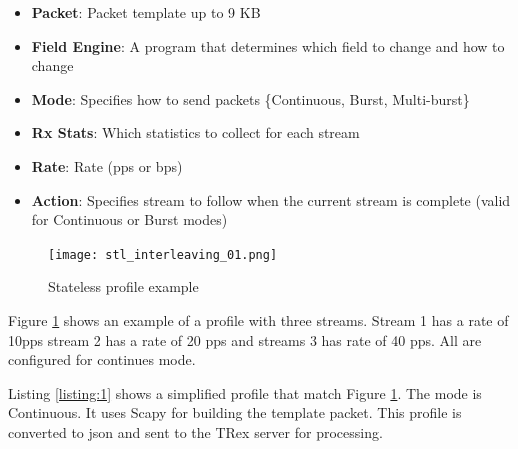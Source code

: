 \documentclass[conference]{IEEEtran}
\begin{document}
\begin{itemize}
  \item \textbf{Packet}: Packet template up to 9 KB
  \item \textbf{Field Engine}: A program that determines which field to change and how to change 
  \item \textbf{Mode}: Specifies how to send packets \{Continuous, Burst, Multi-burst\}
  \item \textbf{Rx Stats}: Which statistics to collect for each stream
  \item \textbf{Rate}: Rate (pps or bps) 
  \item \textbf{Action}: Specifies stream to follow when the current stream is complete (valid for Continuous or Burst modes)
\end{itemize}

\begin{figure}[h]
  \texttt{[image: stl\_interleaving\_01.png]}
  \caption{Stateless profile example}
  \label{fig:stlhello}
\end{figure}

Figure \ref{fig:stlhello} shows an example of a profile with three streams.  
Stream 1 has a rate of 10pps stream 2 has a rate of 20 pps and streams 3 has rate of 40 pps. All are configured for continues mode.

Listing \ref{listing:1} shows a simplified profile that match Figure \ref{fig:stlhello}. The mode is Continuous. 
It uses Scapy for building the template packet. This profile is converted to json and sent to the TRex server for processing. 

  
\end{document}
